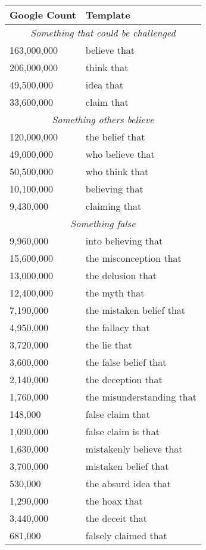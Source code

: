 \documentclass{www2010-submission}
\begin{document}
\begin{figure}[tb]
  \begin{tabular}{|ll|}
    \hline
    {\bf Google Count} & {\bf Template}\\ 
    \hline
    \multicolumn{2}{|c|}{\it Something that could be challenged}\\
    163,000,000 & believe that \\
    206,000,000 & think that \\
    49,500,000 & idea that \\
    33,600,000 & claim that \\
    \hline
    \multicolumn{2}{|c|}{\it Something others believe}\\
    120,000,000 & the belief that \\
    49,000,000 & who believe that \\
    50,500,000 & who think that \\
    10,100,000 & believing that \\
    9,430,000 & claiming that \\
    \hline
    \multicolumn{2}{|c|}{\it Something false}\\
    9,960,000 & into believing that \\
    15,600,000 & the misconception that \\
    13,000,000 & the delusion that \\
    12,400,000 & the myth that \\
    7,190,000 & the mistaken belief that \\
    4,950,000 & the fallacy that \\
    3,720,000 & the lie that \\
    3,600,000 & the false belief that \\
    2,140,000 & the deception that \\
    1,760,000 & the misunderstanding that \\
    148,000 & false claim that \\
    1,090,000 & false claim is that \\
    1,630,000 & mistakenly believe that \\
    3,700,000 & mistaken belief that \\
    530,000 & the absurd idea that \\
    1,290,000 & the hoax that \\
    3,440,000 & the deceit that \\
    681,000 & falsely claimed that \\

\end{tabular}
\end{figure}
\end{document}
